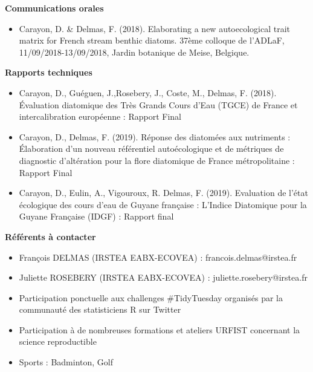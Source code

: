 \documentclass[localFont,alternative]{yaac-another-awesome-cv}
\begin{document}
\textbf{Communications orales}
\begin{itemize}
\item Carayon, D. \& Delmas, F. (2018). Elaborating a new autoecological trait matrix for French stream benthic diatoms. 37ème colloque de l’ADLaF, 11/09/2018-13/09/2018, Jardin botanique de Meise, Belgique.
\end{itemize}

\textbf{Rapports techniques}
\begin{itemize}
\item Carayon, D., Guéguen, J.,Rosebery, J., Coste, M., Delmas, F. (2018). Évaluation diatomique des Très Grands Cours d’Eau (TGCE) de France et intercalibration européenne : Rapport Final

\item Carayon, D., Delmas, F. (2019). Réponse des diatomées aux nutriments : Élaboration d'un nouveau référentiel autoécologique et de métriques de diagnostic d'altération pour la flore diatomique de France métropolitaine : Rapport Final

\item Carayon, D., Eulin, A., Vigouroux, R. Delmas, F. (2019). Evaluation de l’état écologique des cours d’eau de Guyane française : L’Indice Diatomique pour la Guyane Française (IDGF) : Rapport final
\end{itemize}


\textbf{Référents à contacter}
\begin{itemize}
\item François DELMAS (IRSTEA EABX-ECOVEA) : francois.delmas@irstea.fr
\item Juliette ROSEBERY (IRSTEA EABX-ECOVEA) : juliette.rosebery@irstea.fr
\end{itemize}

	


\begin{itemize}
\item Participation ponctuelle aux challenges \#TidyTuesday organisés par la communauté des statisticiens R sur Twitter
\item Participation à de nombreuses formations et ateliers URFIST concernant la science reproductible
\item Sports : Badminton, Golf
\end{itemize}
\end{document}
